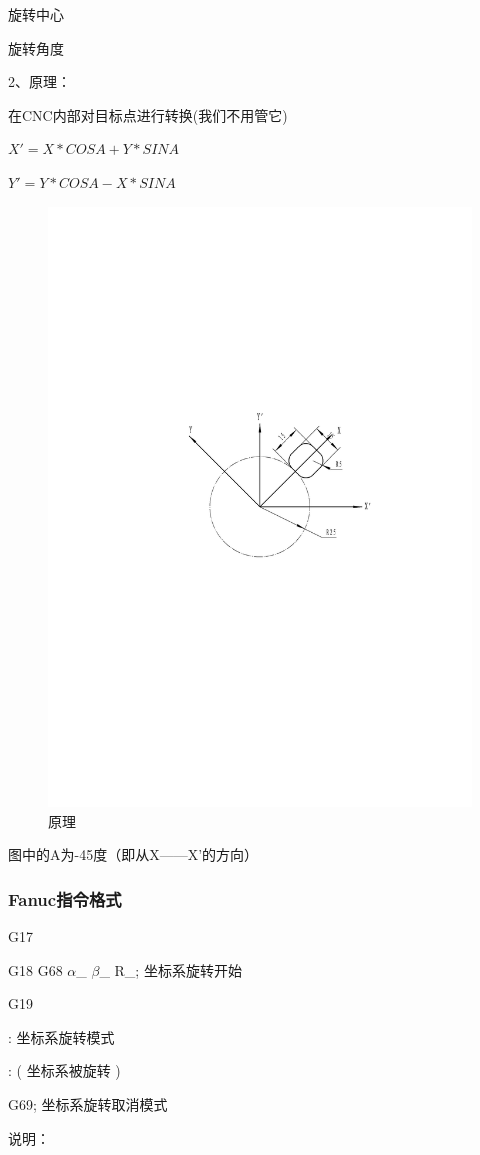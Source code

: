 	旋转中心
	
	旋转角度
	
	2、原理：
	
	在CNC内部对目标点进行转换(我们不用管它)
	
	$X'=X*COSA+Y*SINA$
	
	$Y'=Y*COSA-X*SINA$
	
	\begin{figure}[h]
		\centering
		\includegraphics[width=0.7\linewidth,trim=50 285 50  250,clip]{data/image/31-1}
		\caption{原理}
		\label{fig:31-1}
	\end{figure}
	
	图中的A为-45度（即从X------X’的方向）
	
	
\subsubsection{Fanuc指令格式}

G17

G18 G68 $\alpha$\_ $\beta$\_ R\_; 坐标系旋转开始

G19

:                  坐标系旋转模式 

:                  ( 坐标系被旋转 )

G69;                坐标系旋转取消模式

说明：

